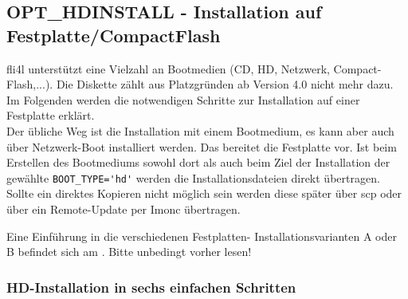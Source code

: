 
\subsection {OPT\_HDINSTALL - Installation auf Festplatte/CompactFlash}

    fli4l unterstützt eine Vielzahl an Bootmedien (CD, HD, Netzwerk, 
    Compact-Flash,...). Die Diskette zählt aus Platzgründen ab Version 
    4.0 nicht mehr dazu.\\

    Im Folgenden werden die notwendigen Schritte zur Installation auf
    einer Festplatte erklärt.\\ 

    Der übliche Weg ist die Installation mit einem Bootmedium, es kann aber auch 
    über Netzwerk-Boot installiert werden. Das  bereitet  
    die Festplatte vor. Ist beim Erstellen des Bootmediums sowohl dort  
    als auch beim Ziel der Installation der gewählte \verb*?BOOT_TYPE='hd'? 
    werden die Installationsdateien direkt übertragen. Sollte ein direktes 
    Kopieren nicht möglich sein werden diese später über scp oder über ein 
    Remote-Update per Imonc übertragen.
    
    Eine Einführung in die verschiedenen Festplatten-
    Installationsvarianten A oder B befindet sich am . Bitte unbedingt vorher lesen!

    \subsubsection{HD-Installation in sechs einfachen Schritten}

